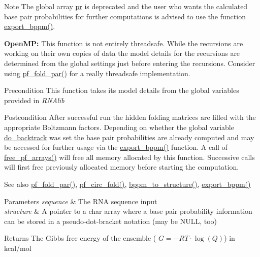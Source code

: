\begin{DoxyNote}{Note}
The global array \hyperlink{fold__vars_8h_ac98ec419070aee6831b44e5c700f090f}{pr} is deprecated and the user who wants the calculated base pair probabilities for further computations is advised to use the function \hyperlink{group__pf__fold_gac5ac7ee281aae1c5cc5898a841178073}{export\+\_\+bppm()}. 

{\bfseries Open\+MP\+:} This function is not entirely threadsafe. While the recursions are working on their own copies of data the model details for the recursions are determined from the global settings just before entering the recursions. Consider using \hyperlink{group__pf__fold_gac4f95bee734b2563a3d6e9932117ebdf}{pf\+\_\+fold\+\_\+par()} for a really threadsafe implementation. 
\end{DoxyNote}
\begin{DoxyPrecond}{Precondition}
This function takes its model details from the global variables provided in {\itshape R\+N\+Alib} 
\end{DoxyPrecond}
\begin{DoxyPostcond}{Postcondition}
After successful run the hidden folding matrices are filled with the appropriate Boltzmann factors. Depending on whether the global variable \hyperlink{group__model__details_gad512b5dd4dbec60faccfe137bb474489}{do\+\_\+backtrack} was set the base pair probabilities are already computed and may be accessed for further usage via the \hyperlink{group__pf__fold_gac5ac7ee281aae1c5cc5898a841178073}{export\+\_\+bppm()} function. A call of \hyperlink{group__pf__fold_gae73db3f49a94f0f72e067ecd12681dbd}{free\+\_\+pf\+\_\+arrays()} will free all memory allocated by this function. Successive calls will first free previously allocated memory before starting the computation. 
\end{DoxyPostcond}
\begin{DoxySeeAlso}{See also}
\hyperlink{group__pf__fold_gac4f95bee734b2563a3d6e9932117ebdf}{pf\+\_\+fold\+\_\+par()}, \hyperlink{group__pf__fold_ga819ce5fca8984004ac81c4a3b04cb735}{pf\+\_\+circ\+\_\+fold()}, \hyperlink{group__struct__utils_ga129d81c4a1ead793c5b2311333e03dfa}{bppm\+\_\+to\+\_\+structure()}, \hyperlink{group__pf__fold_gac5ac7ee281aae1c5cc5898a841178073}{export\+\_\+bppm()} 
\end{DoxySeeAlso}

\begin{DoxyParams}{Parameters}
{\em sequence} & The R\+NA sequence input \\
\hline
{\em structure} & A pointer to a char array where a base pair probability information can be stored in a pseudo-\/dot-\/bracket notation (may be N\+U\+LL, too) \\
\hline
\end{DoxyParams}
\begin{DoxyReturn}{Returns}
The Gibbs free energy of the ensemble ( $G = -RT \cdot \log(Q) $) in kcal/mol 
\end{DoxyReturn}
